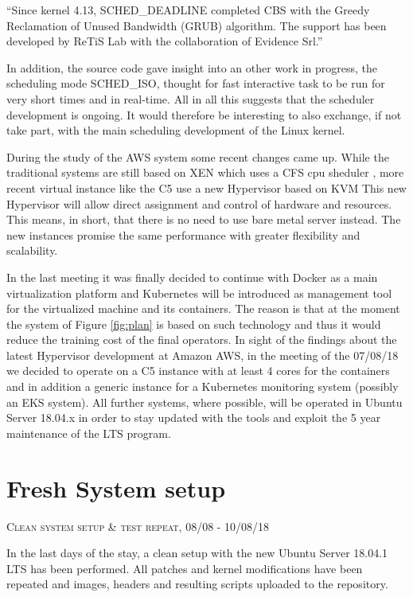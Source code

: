 \documentclass[]{scrartcl}
\begin{document}
``Since kernel 4.13, SCHED\_DEADLINE completed CBS with the Greedy Reclamation of Unused Bandwidth (GRUB) algorithm. The support has been developed by ReTiS Lab with the collaboration of Evidence Srl.''
\bigskip

In addition, the source code gave insight into an other work in progress, the scheduling mode SCHED\_ISO, thought for fast interactive task to be run for very short times and in real-time. All in all this suggests that the scheduler development is ongoing. It would therefore be interesting to also exchange, if not take part, with the main scheduling development of the Linux kernel.

During the study of the AWS system some recent changes came up. While the traditional systems are still based on XEN which uses a CFS cpu sheduler \cite{xen01}, more recent virtual instance like the C5 use a new Hypervisor based on KVM \cite{amazon01} 
This new Hypervisor will allow direct assignment and control of hardware and resources.
This means, in short, that there is no need to use bare metal server instead. The new instances promise the same performance with greater flexibility and scalability.

In the last meeting it was finally decided to continue with Docker as a main virtualization platform and Kubernetes will be introduced as management tool for the virtualized machine and its containers. The reason is that at the moment the system of Figure \ref{fig:plan} is based on such technology and thus it would reduce the training cost of the final operators. In sight of the findings about the latest Hypervisor development at Amazon AWS, in the meeting of the 07/08/18 we decided to operate on a C5 instance with at least 4 cores for the containers and in addition a generic instance for a Kubernetes monitoring system (possibly an EKS system). All further systems, where possible, will be operated in Ubuntu Server 18.04.x in order to stay updated with the tools and exploit the 5 year maintenance of the LTS program.

\cite{Buelnaetal2017}

\section{Fresh System setup}

{\small\textsc{Clean system setup \& test repeat, 08/08 - 10/08/18} \bigskip}

In the last days of the stay, a clean setup with the new Ubuntu Server 18.04.1 LTS has been performed.
All patches and kernel modifications have been repeated and images, headers and resulting scripts uploaded to the repository.
\end{document}
